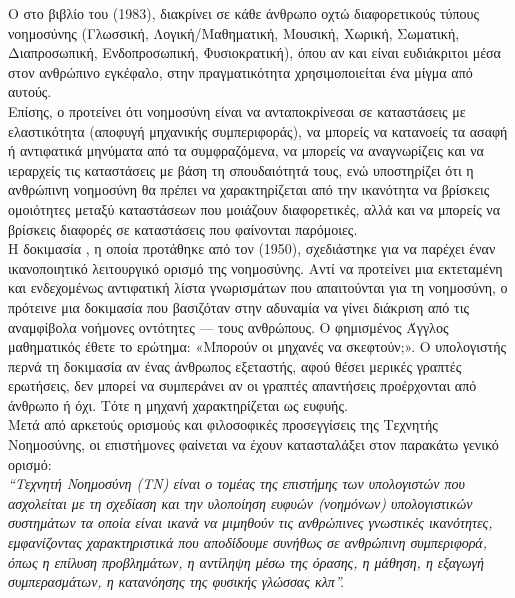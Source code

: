 Ο {} στο βιβλίο του {}(1983), 
διακρίνει σε κάθε άνθρωπο οχτώ  διαφορετικούς τύπους  νοημοσύνης (Γλωσσική,  Λογική/Μαθηματική,  Μουσική, 
Χωρική, Σωματική, Διαπροσωπική, Ενδοπροσωπική, Φυσιοκρατική), 
όπου αν και είναι  ευδιάκριτοι  μέσα  στον  ανθρώπινο  εγκέφαλο,
στην  πραγματικότητα χρησιμοποιείται  ένα  μίγμα  από  αυτούς. \\

Επίσης,  ο {} προτείνει  ότι νοημοσύνη είναι να ανταποκρίνεσαι σε καταστάσεις με 
ελαστικότητα (αποφυγή μηχανικής συμπεριφοράς), να μπορείς να κατανοείς τα ασαφή ή αντιφατικά μηνύματα από τα 
συμφραζόμενα, να μπορείς να αναγνωρίζεις και να ιεραρχείς τις καταστάσεις με βάση τη σπουδαιότητά τους, 
ενώ υποστηρίζει ότι η ανθρώπινη νοημοσύνη θα πρέπει να χαρακτηρίζεται από την ικανότητα 
να βρίσκεις ομοιότητες μεταξύ καταστάσεων που μοιάζουν διαφορετικές, 
αλλά και να μπορείς να βρίσκεις διαφορές σε καταστάσεις που φαίνονται παρόμοιες. \\

Η δοκιμασία {}, η οποία προτάθηκε από τον {} (1950), σχεδιάστηκε 
για να παρέχει έναν ικανοποιητικό λειτουργικό ορισμό της νοημοσύνης. Αντί να προτείνει μια 
εκτεταμένη και ενδεχομένως αντιφατική λίστα γνωρισμάτων που απαιτούνται για τη νοημοσύνη, 
ο {} πρότεινε μια δοκιμασία που βασιζόταν στην αδυναμία να γίνει διάκριση 
από τις αναμφίβολα νοήμονες οντότητες — τους ανθρώπους. O φημισμένος Άγγλος μαθηματικός έθετε το ερώτημα: 
«Μπορούν οι μηχανές να σκεφτούν;». Ο υπολογιστής περνά τη δοκιμασία αν ένας άνθρωπος εξεταστής, 
αφού θέσει μερικές γραπτές ερωτήσεις, δεν μπορεί να συμπεράνει αν οι 
γραπτές απαντήσεις προέρχονται από άνθρωπο ή όχι. 
Tότε η μηχανή χαρακτηρίζεται ως ευφυής. \cite{Stu05} \\

Μετά από αρκετούς ορισμούς και φιλοσοφικές προσεγγίσεις της Τεχνητής Νοημοσύνης, 
οι επιστήμονες φαίνεται να έχουν κατασταλάξει στον παρακάτω γενικό ορισμό: \\

{\textit{“Τεχνητή  Νοημοσύνη (ΤΝ) είναι ο τομέας της επιστήμης των υπολογιστών που 
ασχολείται με τη σχεδίαση και την υλοποίηση ευφυών (νοημόνων) υπολογιστικών συστημάτων
τα οποία είναι ικανά να μιμηθούν τις ανθρώπινες γνωστικές ικανότητες, εμφανίζοντας 
χαρακτηριστικά που αποδίδουμε συνήθως σε ανθρώπινη συμπεριφορά, όπως η επίλυση προβλημάτων, η 
αντίληψη μέσω της όρασης, η μάθηση, η εξαγωγή συμπερασμάτων, η κατανόησης της 
φυσικής γλώσσας κλπ”.}} \\

